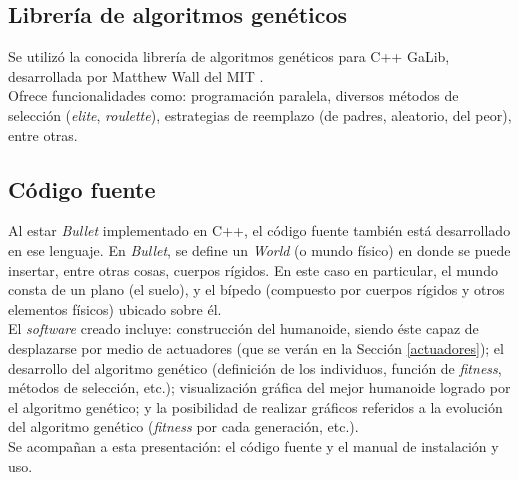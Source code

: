 \documentclass{article}
\begin{document}
\subsection{Librer\'ia de algoritmos gen\'eticos}

Se utiliz\'o la conocida librer\'ia de algoritmos gen\'eticos para C++ GaLib, desarrollada por Matthew Wall del MIT \cite{LinkGaLib}. \\
Ofrece funcionalidades como: programaci\'on paralela, diversos m\'etodos de selecci\'on (\textit{elite}, \textit{roulette}), estrategias de reemplazo (de padres, aleatorio, del peor), entre otras.



\subsection{C\'odigo fuente}

Al estar \textit{Bullet} implementado en C++, el c\'odigo fuente tambi\'en est\'a desarrollado en ese lenguaje. En \textit{Bullet}, se define un \textit{World} (o mundo f\'isico) en donde se puede insertar, entre otras cosas, cuerpos r\'igidos. En este caso en particular, el mundo consta de un plano  (el suelo), y  el b\'ipedo (compuesto por cuerpos r\'igidos y otros elementos f\'isicos) ubicado sobre \'el. \\
El \textit{software} creado incluye: construcci\'on del humanoide, siendo \'este capaz de desplazarse por medio de actuadores (que se ver\'an en la Secci\'on \ref{actuadores}); el desarrollo del algoritmo gen\'etico (definici\'on de los individuos, funci\'on de \textit{fitness}, m\'etodos de selecci\'on, etc.); visualizaci\'on gr\'afica del mejor humanoide logrado por el algoritmo gen\'etico; y la posibilidad de realizar gr\'aficos referidos a la evoluci\'on del algoritmo gen\'etico (\textit{fitness} por cada generaci\'on, etc.). \\
Se acompa\~nan a esta presentaci\'on: el c\'odigo fuente y el manual de instalaci\'on y uso.




\end{document}
